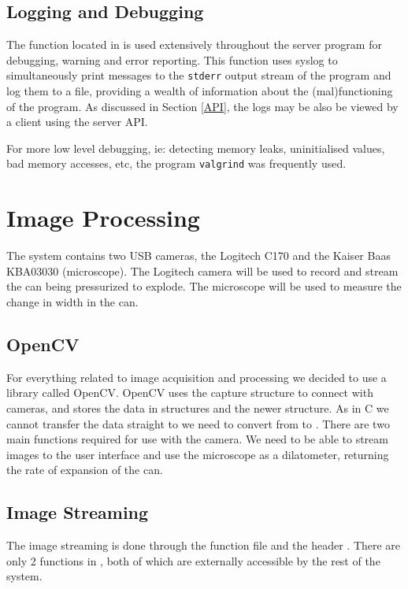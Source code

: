 
\subsection{Logging and Debugging}

The function  located in  is used extensively throughout the server program for debugging, warning and error reporting. This function uses syslog to simultaneously print messages to the \texttt{stderr} output stream of the program and log them to a file, providing a wealth of information about the (mal)functioning of the program. As discussed in Section \ref{API}, the logs may be also be viewed by a client using the server API.

For more low level debugging, ie: detecting memory leaks, uninitialised values, bad memory accesses, etc, the program \texttt{valgrind}\cite{valgrind} was frequently used.



\section{Image Processing}\label{Image Processing}




The system contains two USB cameras, the Logitech C170\cite{logitechC170} and the Kaiser Baas KBA03030 (microscope)\cite{kaiserbaasKBA03030}.  The Logitech camera will be used to record and stream the can being pressurized to explode.  The microscope will be used to measure the change in width in the can. 

\subsection{OpenCV}

For everything related to image acquisition and processing we decided to use a library called OpenCV\cite{OpenCV}. OpenCV uses the capture structure to connect with cameras, and stores the data in  structures and the newer  structure.  As in C we cannot transfer the data straight to  we need to convert from  to .  There are two main functions required for use with the camera.  We need to be able to stream images to the user interface and use the microscope as a dilatometer, returning the rate of expansion of the can.  


\subsection{Image Streaming}
The image streaming is done through the function file  and the header . There are only 2 functions in , both of which are externally accessible by the rest of the system.

